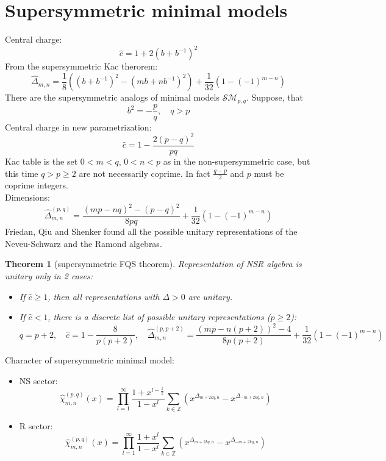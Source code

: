 \documentclass[12pt]{article}
\newtheorem{theorem}{Theorem}[]
\theoremstyle{definition}
\begin{document}
\section{Supersymmetric minimal models}
Central charge:
\begin{equation}
    \hat{c}=1+2(b+b^{-1})^2
\end{equation}
From the supersymmetric Kac therorem:
\begin{equation}
    \hat{\Delta}_{m,n}=\frac{1}{8}((b+b^{-1})^2-(mb+nb^{-1})^2)+\frac{1}{32}(1-(-1)^{m-n})
\end{equation}
There are the supersymmetric analogs of minimal models $\mathcal{SM}_{p,q}$. Suppose, that
\begin{equation}
    b^2=-\frac{p}{q},\quad q>p
\end{equation}
Central charge in new parametrization:
\begin{equation}
    \hat{c}=1-\frac{2(p-q)^2}{pq}
\end{equation}
Kac table is the set $0 < m < q$, $0 < n < p$ as in the non-supersymmetric case, but this time $q>p\geq2$ are not necessarily coprime. In fact $\frac{q-p}{2}$ and $p$ must be coprime integers.\\
Dimensions:
\begin{equation}
    \hat{\Delta}^{(p,q)}_{m,n}=\frac{(mp-nq)^2-(p-q)^2}{8pq}+\frac{1}{32}(1-(-1)^{m-n})
\end{equation}
Friedan, Qiu and Shenker found all the possible unitary representations of the Neveu-Schwarz and the Ramond algebras.
\begin{theorem}[supersymmetric FQS theorem]
    Representation of NSR algebra is unitary only in 2 cases:
    \begin{itemize}
        \item If $\hat{c}\geq1$, then all representations with $\Delta>0$ are unitary.
        \item If $\hat{c}<1$, there is a discrete list of possible unitary representations ($p\geq2$):
        \begin{equation}
            q=p+2,\quad \hat{c}=1-\frac{8}{p(p+2)},\quad\hat{\Delta}^{(p,p+2)}_{m,n}=\frac{(mp-n(p+2))^2-4}{8p(p+2)}+\frac{1}{32}(1-(-1)^{m-n})
        \end{equation}
    \end{itemize}
\end{theorem}
Character of supersymmetric minimal model:
\begin{itemize}
    \item NS sector:
    \begin{equation}
        \hat{\chi}^{(p,q)}_{m,n}(x)=\prod\limits_{l=1}^\infty\frac{1+x^{l-\frac{1}{2}}}{1-x^l}\sum\limits_{k\in\mathbb{Z}}(x^{\Delta_{m+2kq,n}}-x^{\Delta_{-m+2kq,n}})
    \end{equation}
    \item R sector:
    \begin{equation}
        \hat{\chi}^{(p,q)}_{m,n}(x)=\prod\limits_{l=1}^\infty\frac{1+x^l}{1-x^l}\sum\limits_{k\in\mathbb{Z}}(x^{\Delta_{m+2kq,n}}-x^{\Delta_{-m+2kq,n}})
    \end{equation}
\end{itemize}
\end{document}
